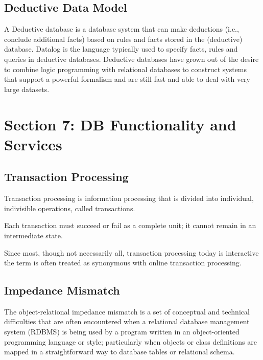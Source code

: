 \documentclass[]{article}
\begin{document}

\subsection{Deductive Data Model}
A Deductive database is a database system that can make deductions (i.e., conclude additional facts) based on rules and facts stored in the (deductive) database. Datalog is the language typically used to specify facts, rules and queries in deductive databases. Deductive databases have grown out of the desire to combine logic programming with relational databases to construct systems that support a powerful formalism and are still fast and able to deal with very large datasets. 


\newpage
\section{Section 7: DB Functionality and Services}

\subsection{Transaction Processing}
Transaction processing is information processing that is divided into individual, indivisible operations, called transactions. 

Each transaction must succeed or fail as a complete unit; it cannot remain in an intermediate state.

Since most, though not necessarily all, transaction processing today is interactive the term is often treated as synonymous with online transaction processing.

\subsection{Impedance Mismatch}
The object-relational impedance mismatch is a set of conceptual and technical difficulties that are often encountered when a relational database management system (RDBMS) is being used by a program written in an object-oriented programming language or style; particularly when objects or class definitions are mapped in a straightforward way to database tables or relational schema.
\end{document}

